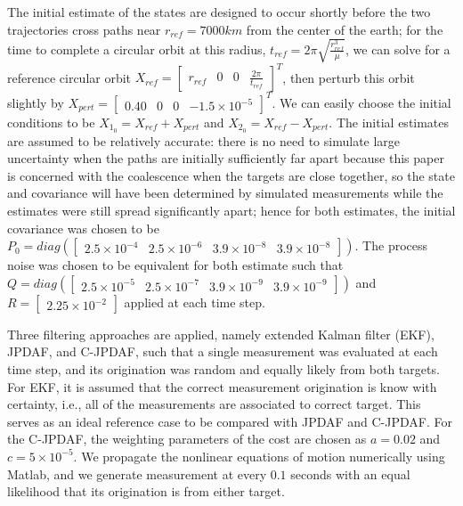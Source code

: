 \documentclass[letterpaper, 10pt, conference]{ieeeconf}
\begin{document}
The initial estimate of the states are designed to occur shortly before the two trajectories cross paths near $r_{ref}=7000km$ from the center of the earth; for the time to complete a circular orbit at this radius, $t_{ref}=2\pi \sqrt{\frac{r_{ref}^3}{\mu}}$, we can solve for a reference circular orbit $X_{ref}=\begin{bmatrix} r_{ref} & 0 & 0 & \frac{2\pi}{t_{ref}}\end{bmatrix}^T$, then perturb this orbit slightly by $X_{pert}=\begin{bmatrix} 0.40 & 0 & 0 & -1.5\times10^{-5}\end{bmatrix}^T$. We can easily choose the initial conditions to be $X_{1_0}= X_{ref}+X_{pert}$ and $X_{2_0}= X_{ref}-X_{pert}$. The initial estimates are assumed to be relatively accurate: there is no need to simulate large uncertainty when the paths are initially sufficiently far apart because this paper is concerned with the coalescence when the targets are close together, so the state and covariance will have been determined by simulated measurements while the estimates were still spread significantly apart; hence for both estimates, the initial covariance was chosen to be $P_0=diag(\begin{bmatrix}
2.5\times10^{-4} & 2.5\times10^{-6} & 3.9\times10^{-8} & 3.9\times10^{-8} \end{bmatrix})$.
The process noise was chosen to be equivalent for both estimate such that $Q=diag(\begin{bmatrix}
2.5\times10^{-5} & 2.5\times10^{-7} & 3.9\times10^{-9}& 3.9\times10^{-9}\end{bmatrix})$ and $R=\begin{bmatrix}
2.25\times10^{-2}
\end{bmatrix}$ applied at each time step.

Three filtering approaches are applied, namely extended Kalman filter (EKF), JPDAF, and C-JPDAF, such that a single measurement was evaluated at each time step, and its origination was random and equally likely from both targets. For EKF, it is assumed that the correct measurement origination is know with certainty, i.e., all of the measurements are associated to correct target. This serves as an ideal reference case to be compared with JPDAF and C-JPDAF. For the C-JPDAF, the weighting parameters of the cost are chosen as $a=0.02$ and $c=5\times10^{-5}$. We propagate the nonlinear equations of motion numerically using Matlab, and we generate measurement at every $0.1$ seconds with an equal likelihood that its origination is from either target.
\end{document}
